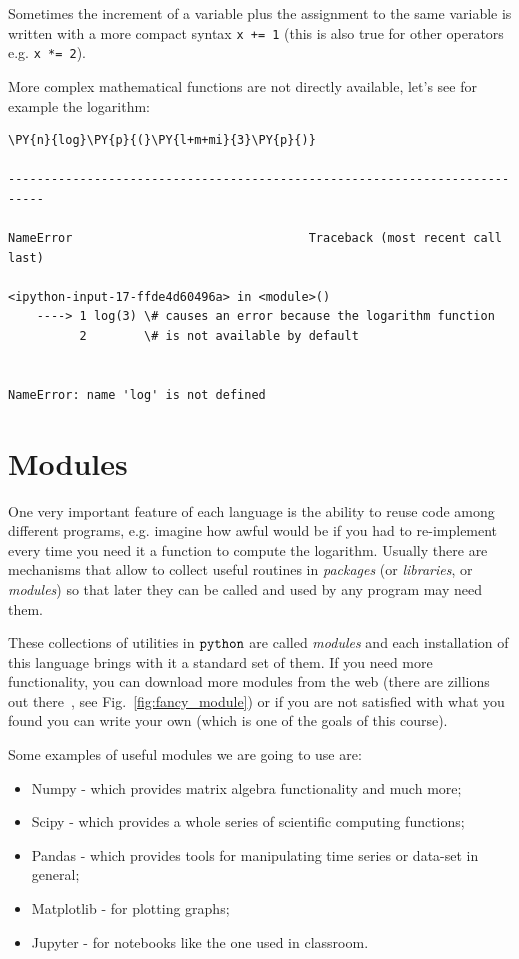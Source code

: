 Sometimes the increment of a variable plus the assignment to the same variable is written 
with a more compact syntax \texttt{x += 1} (this is also true for other operators e.g. \texttt{x *= 2}).

More complex mathematical functions are not directly available, let's see for example the logarithm:

\begin{codebox}            
\begin{Verbatim}[commandchars=\\\{\}]
\PY{n}{log}\PY{p}{(}\PY{l+m+mi}{3}\PY{p}{)}

---------------------------------------------------------------------------

NameError                                 Traceback (most recent call last)

<ipython-input-17-ffde4d60496a> in <module>()
    ----> 1 log(3) \# causes an error because the logarithm function
          2        \# is not available by default


NameError: name 'log' is not defined
\end{Verbatim}
\end{codebox}

\section{Modules}\label{modules}

One very important feature of each language is the ability to reuse code among 
different programs, e.g. imagine how awful would be if you had to re-implement every time 
you need it a function to compute the logarithm.
Usually there are mechanisms that allow to collect useful routines in \emph{packages} 
(or \emph{libraries}, or \emph{modules}) so that later they can be called and used by any 
program may need them.

These collections of utilities in \(\tt{python}\) are called \emph{modules} and each installation 
of this language brings with it a standard set of them. If you need more functionality, you can 
download more modules from the web (there are zillions out there~\cite{modules}, see Fig.~\ref{fig:fancy_module})
or if you are 
not satisfied with what you found you can write your own (which is one of the goals of this course).

Some examples of useful modules we are going to use are:

\begin{itemize}
\tightlist
\item
  Numpy - which provides matrix algebra functionality and much more;
\item
  Scipy - which provides a whole series of scientific computing
  functions;
\item
  Pandas - which provides tools for manipulating time series or data-set
  in general;
\item
  Matplotlib - for plotting graphs;
\item
  Jupyter - for notebooks like the one used in classroom.
\end{itemize}

